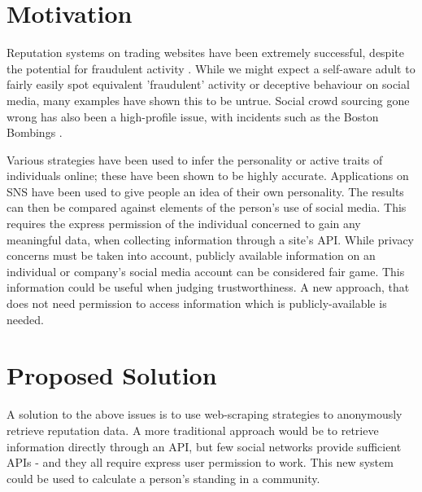 





\section{Motivation}

Reputation systems on trading websites have been extremely successful, despite the potential for fraudulent activity \cite{resnick2002trust}. While we might expect a self-aware adult to fairly easily spot equivalent 'fraudulent' activity or deceptive behaviour on social media, many examples have shown this to be untrue. Social crowd sourcing gone wrong has also been a high-profile issue, with incidents such as the Boston Bombings \cite{crowdsourcing_wad,doan2011crowdsourcing,brabham2008crowdsourcing}.

Various strategies have been used to infer the personality or active traits of individuals online; these have been shown to be highly accurate. Applications on SNS have been used to give people an idea of their own personality. The results can then be compared against elements of the person's use of social media. This requires the express permission of the individual concerned to gain any meaningful data, when collecting information through a site's API. While privacy concerns must be taken into account, publicly available information on an individual or company's social media account can be considered fair game. This information could be useful when judging trustworthiness. A new approach, that does not need permission to access information which is publicly-available is needed. 

\section{Proposed Solution}
A solution to the above issues is to use web-scraping strategies to anonymously retrieve reputation data. A more traditional approach would be to retrieve information directly through an API, but few social networks provide sufficient APIs - and they all require express user permission to work. This new system could be used to calculate a person's standing in a community. 

